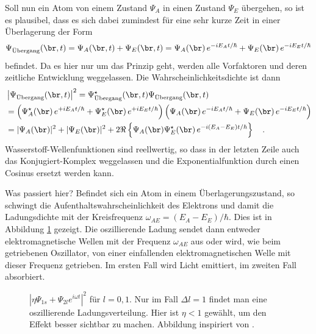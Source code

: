 Soll nun ein Atom von einem Zustand $\Psi_A$ in einen Zustand $\Psi_E$ übergehen, so ist es plausibel, dass es sich dabei zumindest für eine sehr kurze Zeit in einer Überlagerung der Form 
\begin{equation}
    \Psi_\text{Übergang} (\br, t) = \Psi_A(\br, t) + \Psi_E(\br, t) = 
    \Psi_A(\br) \, e^{-i E_A t / \hbar} +  \Psi_E(\br) \, e^{-i E_E t / \hbar}
\end{equation}
befindet. Da es hier nur um das Prinzip geht, werden alle Vorfaktoren und deren zeitliche Entwicklung weggelassen. Die Wahrscheinlichkeitsdichte ist dann
\begin{align}
    & \left| \Psi_\text{Übergang} (\br, t)  \right|^2 =  \Psi_\text{Übergang}^\star (\br, t) \Psi_\text{Übergang} (\br, t)  \\
   & =  \left(  \Psi_A^\star(\br) \, e^{+i E_A t / \hbar} +  \Psi_E^\star(\br) \, e^{+i E_E t / \hbar} \right)
    \left(  \Psi_A(\br) \, e^{-i E_A t / \hbar} +  \Psi_E(\br) \, e^{-i E_E t / \hbar} \right) \\
    & = | \Psi_A(\br)|^2 + | \Psi_E(\br)|^2  + 2 \Re \left\{ \Psi_A(\br)\Psi_E^\star(\br)  \, e^{-i (E_A - E_E) t / \hbar}  \right\}   \quad .
\end{align}
Wasserstoff-Wellenfunktionen sind reellwertig, so dass in der letzten Zeile auch das Konjugiert-Komplex weggelassen und die Exponentialfunktion durch einen Cosinus ersetzt werden kann.

Was passiert hier? Befindet sich ein Atom in einem Überlagerungszustand, so schwingt die Aufenthaltswahrscheinlichkeit des Elektrons und damit die Ladungsdichte mit der Kreisfrequenz $\omega_{AE} = (E_A - E_E) / \hbar $. Dies ist in Abbildung  \ref{fig:7_transition_panel} gezeigt. Die oszillierende Ladung sendet dann entweder elektromagnetische Wellen mit der Frequenz $\omega_{AE}$ aus oder wird, wie beim getriebenen Oszillator, von einer einfallenden elektromagnetischen Welle mit dieser Frequenz getrieben. Im ersten Fall wird Licht emittiert, im zweiten Fall absorbiert.

\begin{figure}    
    \caption{ $| \eta \Psi_{1s} + \Psi_{2l} e^{i \omega t}|^2$ für $l= 0,1$. Nur im Fall $\Delta l = 1$ findet man eine oszillierende Ladungsverteilung. Hier ist $\eta < 1$ gewählt, um den Effekt besser sichtbar zu machen. Abbildung inspiriert von \cite{Reider_photonik}.}
    \label{fig:7_transition_panel}
\end{figure}


